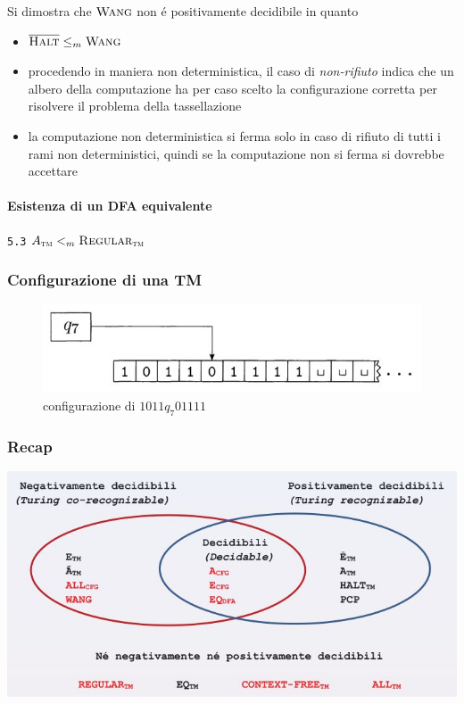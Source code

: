 \documentclass[
                        12pt, %
                        a4paper, %
                        oneside, %
                        headinclude,footinclude, %
                        BCOR5mm, %
                  ]{scrartcl}
\begin{document}
Si dimostra che \(\textsc{Wang}\) non é positivamente decidibile in quanto
\begin{itemize}
\item \(\overline{\textsc{Halt}} \le_m \textsc{Wang}\)
\item procedendo in maniera non deterministica, il caso di \emph{non-rifiuto} indica che un albero della computazione ha per caso scelto la configurazione corretta per risolvere il problema della tassellazione
\item la computazione non deterministica si ferma solo in caso di rifiuto di tutti i rami non deterministici, quindi se la computazione non si ferma si dovrebbe accettare
\end{itemize}

\paragraph{Esistenza di un DFA equivalente}
\label{sec:org8318c62}
\texttt{5.3}
\(A_{\textsc{tm}} <_m\textsc{Regular}_{\textsc{tm}}\)
\subsubsection{Configurazione di una TM}
\label{sec:org8b15e85}
\begin{figure}[htbp]
\centering
\includegraphics[width=.9\linewidth]{../media/img/tm-configuration.jpg}
\caption{configurazione di \(1011 q_{7} 01111\)}
\end{figure}
\subsubsection{Recap}
\label{sec:orgc905b87}
\begin{center}
\includegraphics[width=.9\linewidth]{../media/img/decidability.jpg}
\end{center}
\end{document}
